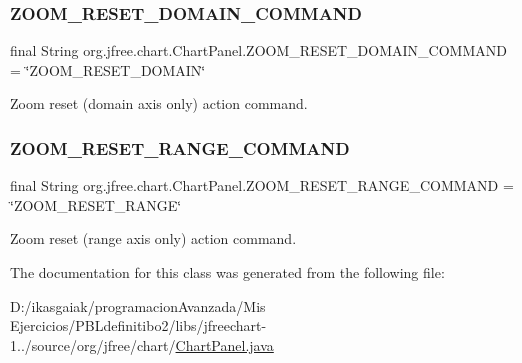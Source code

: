 \subsubsection{\texorpdfstring{Z\+O\+O\+M\+\_\+\+R\+E\+S\+E\+T\+\_\+\+D\+O\+M\+A\+I\+N\+\_\+\+C\+O\+M\+M\+A\+ND}{ZOOM\_RESET\_DOMAIN\_COMMAND}}
{\footnotesize\ttfamily final String org.\+jfree.\+chart.\+Chart\+Panel.\+Z\+O\+O\+M\+\_\+\+R\+E\+S\+E\+T\+\_\+\+D\+O\+M\+A\+I\+N\+\_\+\+C\+O\+M\+M\+A\+ND = \char`\"{}Z\+O\+O\+M\+\_\+\+R\+E\+S\+E\+T\+\_\+\+D\+O\+M\+A\+IN\char`\"{}\hspace{0.3cm}{\ttfamily [static]}}

Zoom reset (domain axis only) action command. \mbox{\label{classorg_1_1jfree_1_1chart_1_1_chart_panel_a5f0de3eb34298ab398f77c1474150e9e}} 
\subsubsection{\texorpdfstring{Z\+O\+O\+M\+\_\+\+R\+E\+S\+E\+T\+\_\+\+R\+A\+N\+G\+E\+\_\+\+C\+O\+M\+M\+A\+ND}{ZOOM\_RESET\_RANGE\_COMMAND}}
{\footnotesize\ttfamily final String org.\+jfree.\+chart.\+Chart\+Panel.\+Z\+O\+O\+M\+\_\+\+R\+E\+S\+E\+T\+\_\+\+R\+A\+N\+G\+E\+\_\+\+C\+O\+M\+M\+A\+ND = \char`\"{}Z\+O\+O\+M\+\_\+\+R\+E\+S\+E\+T\+\_\+\+R\+A\+N\+GE\char`\"{}\hspace{0.3cm}{\ttfamily [static]}}

Zoom reset (range axis only) action command. 

The documentation for this class was generated from the following file\+:\begin{DoxyCompactItemize}
\item 
D\+:/ikasgaiak/programacion\+Avanzada/\+Mis Ejercicios/\+P\+B\+Ldefinitibo2/libs/jfreechart-\/1../source/org/jfree/chart/\mbox{\hyperlink{_chart_panel_8java}{Chart\+Panel.\+java}}\end{DoxyCompactItemize}

